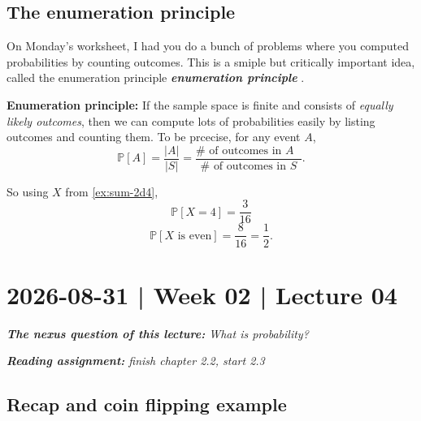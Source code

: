 \documentclass[10pt]{article}
\theoremstyle{definition}
\newcommand{\1}[1]{\textbf{1}_{\left[#1\right]}} %
\def\P{\mathbb{P}} %
\DeclareRobustCommand{\demph}[1]{%
  \ifmmode
  {\color{Blue}#1}%
  \else
  {\color{Blue}\bfseries\slshape #1}%
  \fi
}
\begin{document}
\subsection{The enumeration principle}

On Monday's worksheet, I had you do a bunch of problems where you computed
probabilities by counting outcomes. This is a smiple but critically important
idea, called the \demph{enumeration principle}.
\begin{center}
  \colorbox{gray!10}{%
    \begin{minipage}{0.8\textwidth}
      \textbf{Enumeration principle:} If the sample space is finite and
      consists of \textit{equally likely outcomes}, then we can compute lots
      of probabilities easily by listing outcomes and counting them. To be
      prcecise, for any event $A$,
      \begin{equation*}
        \P\left[A \right] = \frac{|A|}{|S|}  = \frac{\# \text{ of outcomes in $A$ }}{\# \text{ of outcomes in $S$}}.
      \end{equation*}
    \end{minipage}%
  }
\end{center}
So using $X$ from \cref{ex:sum-2d4},
\begin{equation*}
  \P\left[X=4 \right] = \frac{3}{16}
\end{equation*}
\begin{equation*}
  \P\left[ X\text{ is even} \right] =\frac{8}{16} = \frac{1}{2}.
\end{equation*}

\newpage
\section{2026-08-31 | Week 02 | Lecture 04}

\begin{center}
  \begin{tcolorbox}[width=0.9\textwidth, colback=white, colframe=black]
    \textit{\textbf{The nexus question of this lecture:} What is probability?}

    \textit{\textbf{Reading assignment:} finish chapter 2.2, start 2.3}
  \end{tcolorbox}
\end{center}

\subsection{Recap and coin flipping example}
\end{document}
